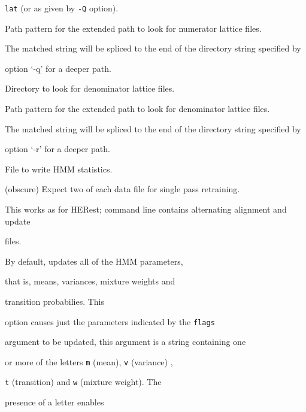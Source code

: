 \begin{optlist}
      \texttt{lat} (or as given by \texttt{-Q} option).





     Path pattern for the extended path to look for numerator lattice files. 


      The matched string will be spliced to the end of the directory string specified by


      option `-q' for a deeper path.





     Directory to look for denominator lattice files.





     Path pattern for the extended path to look for denominator lattice files.


     The matched string will be spliced to the end of the directory string specified by


      option `-r' for a deeper path.





    File to write HMM statistics.





   (obscure) Expect two of each data file for single pass retraining.  


    This works as for HERest; command line contains alternating alignment and update


    files.





   By default,  updates all of the HMM parameters,


      that is, means, variances, mixture weights and 


      transition probabilies. This 


      option causes just the parameters indicated by the {\tt flags}


      argument to be updated, this argument is a string containing one


      or more of the letters {\tt m} (mean), {\tt v} (variance) ,


      {\tt t} (transition) and {\tt w} (mixture weight).  The 


      presence of a letter enables



\end{optlist}
